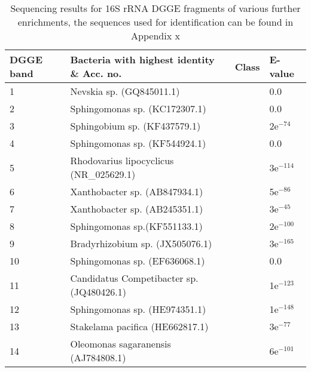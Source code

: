 \documentclass[11pt]{article}
\begin{document}
\begin{sidewaystable}[!htbp]
\begin{tabular}{ | l | p{9cm} | p{4.5cm} | l | }
\hline
DGGE band & Bacteria with highest identity \& Acc. no. & Class & E-value \\
\hline
1 & Nevskia sp. (GQ845011.1) &   & 0.0  \\
\hline
2 & Sphingomonas sp. (KC172307.1) &   & 0.0 \\
\hline
3 & Sphingobium sp. (KF437579.1) &   & 2e$^{-74}$ \\
\hline
4 & Sphingomonas sp. (KF544924.1) &   & 0.0  \\
\hline
5 & Rhodovarius lipocyclicus (NR\_025629.1) &   & 3e$^{-114}$ \\
\hline
6 & Xanthobacter sp. (AB847934.1) &   & 5e$^{-86}$  \\
\hline
7 & Xanthobacter sp. (AB245351.1) &   & 3e$^{-45}$  \\
\hline
8 & Sphingomonas sp.(KF551133.1) &   & 2e$^{-100}$  \\
\hline
9 & Bradyrhizobium sp. (JX505076.1) &   & 3e$^{-165}$  \\
\hline
10 & Sphingomonas sp. (EF636068.1) &   & 0.0  \\
\hline
11 & Candidatus Competibacter sp. (JQ480426.1) &   & 1e$^{-123}$  \\
\hline
12 & Sphingomonas sp. (HE974351.1) &   &  1e$^{-148}$ \\
\hline
13 & Stakelama pacifica (HE662817.1) &   & 3e$^{-77}$  \\
\hline
14 & Oleomonas sagaranensis (AJ784808.1) &   & 6e$^{-101}$  \\
\hline
\end{tabular}
\caption{Sequencing results for 16S rRNA DGGE fragments of various further enrichments, the sequences used for identification can be found in Appendix x}
\end{sidewaystable}
\end{document}
